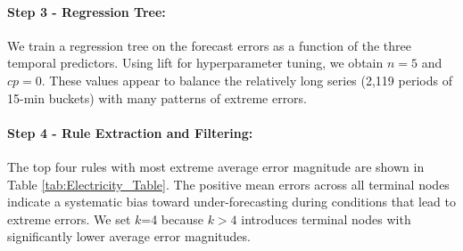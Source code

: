 \documentclass[12pt]{article}
\begin{document}
\paragraph{Step 3 - Regression Tree:} We train a regression tree on the forecast errors as a function of the three temporal predictors. Using lift for hyperparameter tuning, we obtain $n = 5$ and $cp = 0$. These values appear to balance the relatively long series %
(2,119 periods of 15-min buckets) with many patterns of extreme errors. %

\paragraph{Step 4 - Rule Extraction and Filtering:}
\label{sec:rule_filtering}
The top four rules with most extreme average error magnitude are shown in Table \ref{tab:Electricity_Table}. 
The positive mean errors across all terminal nodes indicate a systematic bias toward under-forecasting during conditions that lead to extreme errors. We set $k$=4 because $k>4$ introduces terminal nodes with significantly lower 
average error magnitudes. %

\end{document}
